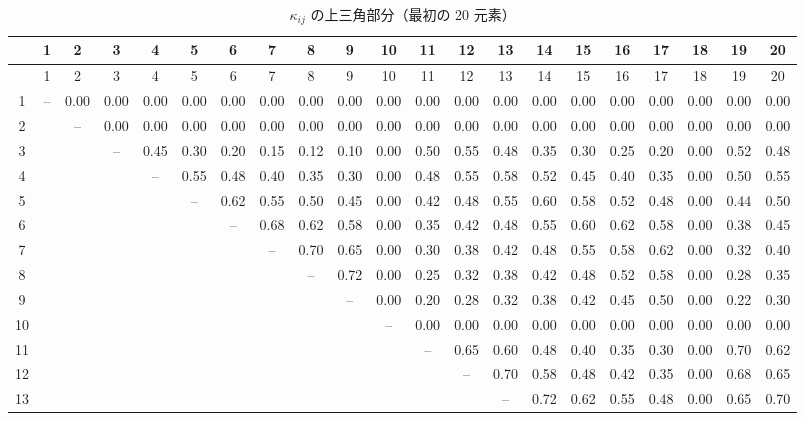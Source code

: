 \documentclass[11pt,a4paper]{article}
\theoremstyle{remark}
\begin{document}
	{\tiny
		\begin{longtable}{c|*{20}{c}}
			\caption{\(\kappa_{ij}\) の上三角部分（最初の 20 元素）} \label{tab:kappa-full-20} \\
			\toprule
			& 1 & 2 & 3 & 4 & 5 & 6 & 7 & 8 & 9 & 10 & 11 & 12 & 13 & 14 & 15 & 16 & 17 & 18 & 19 & 20 \\
			\midrule
			\endfirsthead
			\toprule
			& 1 & 2 & 3 & 4 & 5 & 6 & 7 & 8 & 9 & 10 & 11 & 12 & 13 & 14 & 15 & 16 & 17 & 18 & 19 & 20 \\
			\midrule
			\endhead
			1  & – & 0.00 & 0.00 & 0.00 & 0.00 & 0.00 & 0.00 & 0.00 & 0.00 & 0.00 & 0.00 & 0.00 & 0.00 & 0.00 & 0.00 & 0.00 & 0.00 & 0.00 & 0.00 & 0.00 \\
			2  &   & – & 0.00 & 0.00 & 0.00 & 0.00 & 0.00 & 0.00 & 0.00 & 0.00 & 0.00 & 0.00 & 0.00 & 0.00 & 0.00 & 0.00 & 0.00 & 0.00 & 0.00 & 0.00 \\
			3  &   &   & – & 0.45 & 0.30 & 0.20 & 0.15 & 0.12 & 0.10 & 0.00 & 0.50 & 0.55 & 0.48 & 0.35 & 0.30 & 0.25 & 0.20 & 0.00 & 0.52 & 0.48 \\
			4  &   &   &   & – & 0.55 & 0.48 & 0.40 & 0.35 & 0.30 & 0.00 & 0.48 & 0.55 & 0.58 & 0.52 & 0.45 & 0.40 & 0.35 & 0.00 & 0.50 & 0.55 \\
			5  &   &   &   &   & – & 0.62 & 0.55 & 0.50 & 0.45 & 0.00 & 0.42 & 0.48 & 0.55 & 0.60 & 0.58 & 0.52 & 0.48 & 0.00 & 0.44 & 0.50 \\
			6  &   &   &   &   &   & – & 0.68 & 0.62 & 0.58 & 0.00 & 0.35 & 0.42 & 0.48 & 0.55 & 0.60 & 0.62 & 0.58 & 0.00 & 0.38 & 0.45 \\
			7  &   &   &   &   &   &   & – & 0.70 & 0.65 & 0.00 & 0.30 & 0.38 & 0.42 & 0.48 & 0.55 & 0.58 & 0.62 & 0.00 & 0.32 & 0.40 \\
			8  &   &   &   &   &   &   &   & – & 0.72 & 0.00 & 0.25 & 0.32 & 0.38 & 0.42 & 0.48 & 0.52 & 0.58 & 0.00 & 0.28 & 0.35 \\
			9  &   &   &   &   &   &   &   &   & – & 0.00 & 0.20 & 0.28 & 0.32 & 0.38 & 0.42 & 0.45 & 0.50 & 0.00 & 0.22 & 0.30 \\
			10 &   &   &   &   &   &   &   &   &   & – & 0.00 & 0.00 & 0.00 & 0.00 & 0.00 & 0.00 & 0.00 & 0.00 & 0.00 & 0.00 \\
			11 &   &   &   &   &   &   &   &   &   &   & – & 0.65 & 0.60 & 0.48 & 0.40 & 0.35 & 0.30 & 0.00 & 0.70 & 0.62 \\
			12 &   &   &   &   &   &   &   &   &   &   &   & – & 0.70 & 0.58 & 0.48 & 0.42 & 0.35 & 0.00 & 0.68 & 0.65 \\
			13 &   &   &   &   &   &   &   &   &   &   &   &   & – & 0.72 & 0.62 & 0.55 & 0.48 & 0.00 & 0.65 & 0.70 \\

\end{longtable}}
\end{document}
